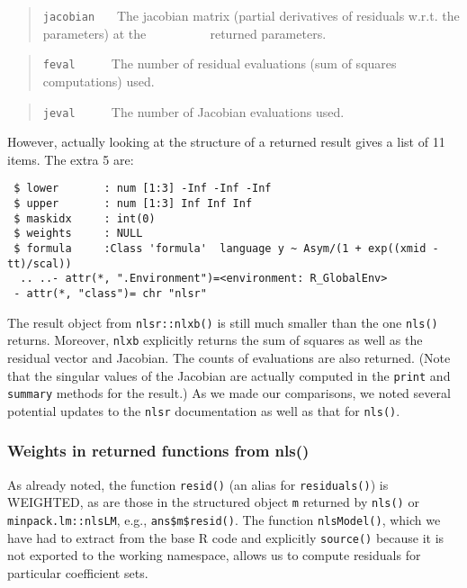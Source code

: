 \begin{quote}
\texttt{jacobian} \(~~~~~\) The jacobian matrix (partial derivatives of residuals w.r.t. the
parameters) at the \newline
\(~~~~~~~~~~~~~~~~~~~~\) returned parameters.
\end{quote}

\begin{quote}
\texttt{feval} \(~~~~~~~~~~\) The number of residual evaluations (sum of squares computations) used.
\end{quote}

\begin{quote}
\texttt{jeval} \(~~~~~~~~~~\) The number of Jacobian evaluations used.
\end{quote}

However, actually looking at the structure of a returned result gives a list of 11
items. The extra 5 are:

\begin{verbatim}
 $ lower       : num [1:3] -Inf -Inf -Inf
 $ upper       : num [1:3] Inf Inf Inf
 $ maskidx     : int(0) 
 $ weights     : NULL
 $ formula     :Class 'formula'  language y ~ Asym/(1 + exp((xmid - tt)/scal))
  .. ..- attr(*, ".Environment")=<environment: R_GlobalEnv> 
 - attr(*, "class")= chr "nlsr"
\end{verbatim}

The result object from \texttt{nlsr::nlxb()} is still much smaller than the one \texttt{nls()}
returns. Moreover, \texttt{nlxb}
explicitly returns the sum of squares as well as the residual vector and Jacobian.
The counts of evaluations are also returned.
(Note that the singular values of the Jacobian are
actually computed in the \texttt{print} and \texttt{summary} methods for the result.)
As we made our comparisons, we noted several potential updates to the \texttt{nlsr}
documentation as well as that for \texttt{nls()}.

\hypertarget{weights-in-returned-functions-from-nls}{%
\subsubsection{Weights in returned functions from nls()}\label{weights-in-returned-functions-from-nls}}

As already noted, the function \texttt{resid()} (an alias for \texttt{residuals()}) is
WEIGHTED, as are those in the structured object \texttt{m} returned by \texttt{nls()} or
\texttt{minpack.lm::nlsLM}, e.g., \texttt{ans\$m\$resid()}. The function \texttt{nlsModel()}, which
we have had to extract from the base R code and explicitly \texttt{source()} because
it is not exported to the working namespace, allows us to compute residuals
for particular coefficient sets.

